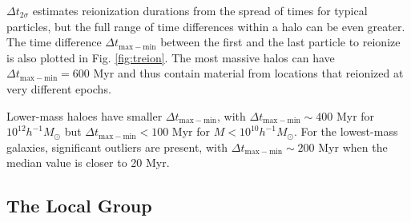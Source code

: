\documentclass[twocolumn]{aastex61}
\begin{document}
$\Delta t_{2\sigma}$ estimates reionization durations from the spread of times for typical particles, but the full range of time differences within a halo can be even greater.
The time difference $\Delta t_\mathrm{max-min}$ between the first and the last particle to reionize is also plotted in Fig. \ref{fig:treion}. The most massive halos can have $\Delta t_\mathrm{max-min} = 600$ Myr and thus contain material from locations that reionized at very different epochs.%

Lower-mass haloes have smaller $\Delta t_\mathrm{max-min}$, with $\Delta t_\mathrm{max-min}\sim 400$ Myr for $10^{12} h^{-1}M_\odot$ but $\Delta t_\mathrm{max-min}< 100$ Myr for $M<10^{10} h^{-1} M_\odot$. For the lowest-mass galaxies, significant outliers are present, with $\Delta t_\mathrm{max-min}\sim 200$ Myr when the median value is closer to 20 Myr.


\subsection{The Local Group}
\end{document}
